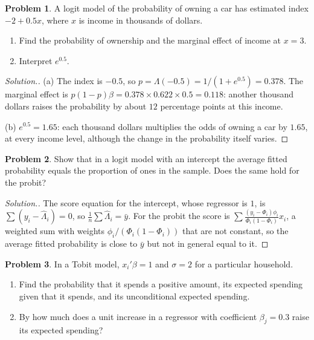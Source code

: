 \documentclass[11pt,a4paper]{article}
\numberwithin{equation}{section}
\theoremstyle{definition}
\newtheorem{problemx}{Problem}[subsection]
\newenvironment{problem}{\begin{problemx}}{\end{problemx}}
\newenvironment{solution}
  {\renewcommand{\qedsymbol}{}\begin{proof}[\textit{Solution}.]}
  {\end{proof}}
\begin{document}
\begin{problem}
A logit model of the probability of owning a car has estimated index $-2 + 0.5x$, where $x$ is income in thousands of dollars.
\begin{enumerate}[label=(\alph*)]
\item Find the probability of ownership and the marginal effect of income at $x = 3$.
\item Interpret $e^{0.5}$.
\end{enumerate}
\end{problem}

\begin{solution}
(a) The index is $-0.5$, so $p = \Lambda(-0.5) = 1/(1 + e^{0.5}) = 0.378$. The marginal effect is $p(1 - p)\beta = 0.378 \times 0.622 \times 0.5 = 0.118$: another thousand dollars raises the probability by about
$12$ percentage points at this income.

(b) $e^{0.5} = 1.65$: each thousand dollars multiplies the odds of owning a car by $1.65$, at every income level, although the change in the probability itself
varies.
\end{solution}

\begin{problem}
Show that in a logit model with an intercept the average fitted probability equals the proportion of ones in the sample. Does the same hold for the
probit?
\end{problem}

\begin{solution}
The score equation for the intercept, whose regressor is $1$, is $\sum(y_i - \hat\Lambda_i) = 0$, so $\frac1n\sum\hat\Lambda_i = \bar y$. For the probit the score is
$\sum\frac{(y_i - \Phi_i)\phi_i}{\Phi_i(1 - \Phi_i)}x_i$, a weighted sum with weights $\phi_i/(\Phi_i(1 - \Phi_i))$ that are not constant, so the average fitted probability is close to $\bar y$ but not
in general equal to it.
\end{solution}

\begin{problem}
In a Tobit model, $x_i'\beta = 1$ and $\sigma = 2$ for a particular household.
\begin{enumerate}[label=(\alph*)]
\item Find the probability that it spends a positive amount, its expected spending given that it spends, and its unconditional expected spending.
\item By how much does a unit increase in a regressor with coefficient $\beta_j = 0.3$ raise its expected spending?
\end{enumerate}
\end{problem}
\end{document}
